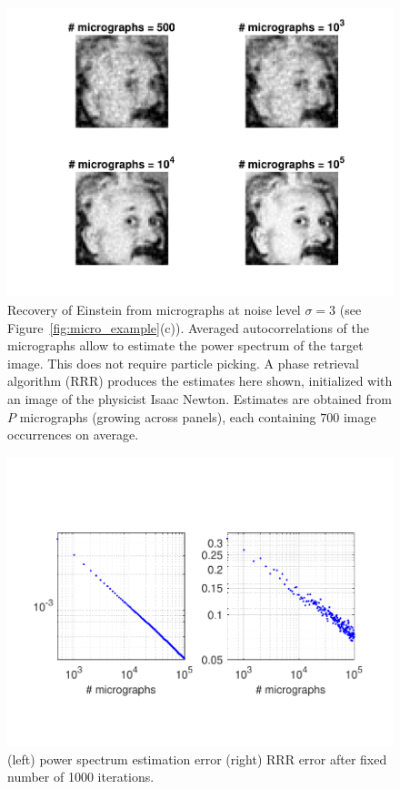 \documentclass[english,11pt]{article}
\newcommand{\1}{\mathbf{1}}
\newcommand{\TODO}[1]{{\color{red}{[#1]}}}
\numberwithin{equation}{section}
\theoremstyle{plain}
\theoremstyle{definition}
\theoremstyle{remark}
\theoremstyle{plain}
\theoremstyle{remark}
\theoremstyle{plain}
\theoremstyle{plain}
\newcommand{\SNR}{\ensuremath{\textsf{SNR}}}
\begin{document}
\begin{figure}[h!]
	\centering
\includegraphics[scale=0.8]{Einstien_progress_examples}
\caption{\label{fig:Einst_example} Recovery of Einstein from micrographs at noise level $\sigma = 3$ (see Figure~\ref{fig:micro_example}(c)). Averaged autocorrelations of the micrographs allow to estimate the power spectrum of the target image. This does not require particle picking. A phase retrieval algorithm (RRR) produces the estimates here shown, initialized with an image of the physicist Isaac Newton. Estimates are obtained from $P$ micrographs (growing across panels), each containing $700$ image occurrences on average.
	}
\end{figure}


\begin{figure}[h]
\centering
\includegraphics[scale=1]{Einstein_progress} (left) power spectrum estimation error (right) RRR error after fixed number of 1000 iterations.
\end{figure}
\end{document}
